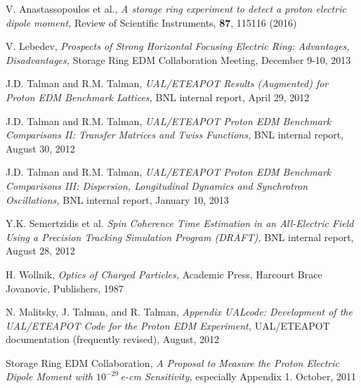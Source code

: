 \documentclass[12]{article}
\begin{document}
\begin{thebibliography}{99}

V. Anastassopoulos et al., \emph{A storage ring experiment to detect a proton 
electric dipole moment,} Review of Scientific Instruments, 
{\bf 87}, 115116 (2016)

V. Lebedev, \emph{Prospects of Strong Horizontal Focusing Electric Ring:
Advantages, Disadvantages,} Storage Ring EDM
Collaboration Meeting, December 9-10, 2013 

J.D. Talman and R.M. Talman, \emph{ UAL/ETEAPOT Results 
(Augmented) for Proton EDM Benchmark Lattices,} BNL internal
report, April 29, 2012

J.D. Talman and R.M. Talman, \emph{ UAL/ETEAPOT Proton EDM 
Benchmark Comparisons II: Transfer Matrices and Twiss Functions,} 
BNL internal report, August 30, 2012

J.D. Talman and R.M. Talman, \emph{ UAL/ETEAPOT Proton EDM Benchmark 
Comparisons III: Dispersion, Longitudinal Dynamics and Synchrotron 
Oscillations,} BNL internal report, January 10, 2013

Y.K. Semertzidis et al. \emph{Spin Coherence Time Estimation in an All-Electric Field 
Using a Precision Tracking Simulation Program (DRAFT),}  
BNL internal report, August 28, 2012

H. Wollnik, \emph{Optics of Charged Particles,} Academic Press, Harcourt
Brace Jovanovic, Publishers, 1987

N. Malitsky, J. Talman, and R. Talman, \emph{Appendix UALcode: Development of the
UAL/ETEAPOT Code for the Proton EDM Experiment,} UAL/ETEAPOT documentation
(frequently revised), August, 2012

Storage Ring EDM Collaboration, \emph{A Proposal to Measure the
Proton Electric Dipole Moment with $10^{-29}\,$e-cm Sensitivity,}
especially Appendix 1. October, 2011

\end{thebibliography}
\end{document}
